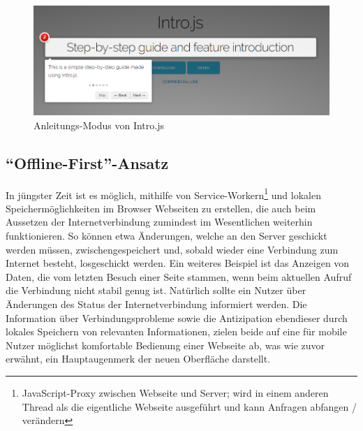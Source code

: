  \begin{figure}
    \centering
    \captionsetup{justification=centering}
    \includegraphics[width=\textwidth]{figures/intro_js_example.png}
        \caption{Anleitungs-Modus von Intro.js \parencite{mehrabani}}\label{fig:intro_js_example}
\end{figure}

\subsection{``Offline-First''-Ansatz}
In jüngster Zeit ist es möglich, mithilfe von Service-Workern\footnote{JavaScript-Proxy zwischen Webseite und Server; wird in einem anderen Thread als die eigentliche Webseite ausgeführt und kann Anfragen abfangen / verändern} und lokalen Speichermöglichkeiten im Browser Webseiten zu erstellen, die auch beim Aussetzen der Internetverbindung zumindest im Wesentlichen weiterhin funktionieren. So können etwa Änderungen, welche an den Server geschickt werden müssen, zwischengespeichert und, sobald wieder eine Verbindung zum Internet besteht, losgeschickt werden. Ein weiteres Beispiel ist das Anzeigen von Daten, die vom letzten Besuch einer Seite stammen, wenn beim aktuellen Aufruf die Verbindung nicht stabil genug ist. Natürlich sollte ein Nutzer über Änderungen des Status der Internetverbindung informiert werden.
Die Information über Verbindungsprobleme sowie die Antizipation ebendieser durch lokales Speichern von relevanten Informationen, zielen beide auf eine für mobile Nutzer möglichst komfortable Bedienung einer Webseite ab, was wie zuvor erwähnt, ein Hauptaugenmerk der neuen Oberfläche darstellt.

